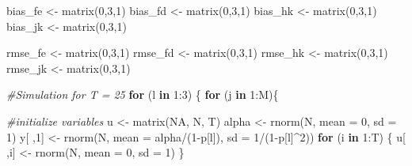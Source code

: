 \documentclass[
]{article}
\newenvironment{Shaded}{\begin{snugshade}}{\end{snugshade}}
\newcommand{\AttributeTok}[1]{\textcolor[rgb]{0.77,0.63,0.00}{#1}}
\newcommand{\CommentTok}[1]{\textcolor[rgb]{0.56,0.35,0.01}{\textit{#1}}}
\newcommand{\ConstantTok}[1]{\textcolor[rgb]{0.00,0.00,0.00}{#1}}
\newcommand{\ControlFlowTok}[1]{\textcolor[rgb]{0.13,0.29,0.53}{\textbf{#1}}}
\newcommand{\DecValTok}[1]{\textcolor[rgb]{0.00,0.00,0.81}{#1}}
\newcommand{\FunctionTok}[1]{\textcolor[rgb]{0.00,0.00,0.00}{#1}}
\newcommand{\NormalTok}[1]{#1}
\newcommand{\OtherTok}[1]{\textcolor[rgb]{0.56,0.35,0.01}{#1}}
\newcommand{\SpecialCharTok}[1]{\textcolor[rgb]{0.00,0.00,0.00}{#1}}
\begin{document}
\begin{Shaded}
\begin{Highlighting}[]
\NormalTok{bias\_fe }\OtherTok{\textless{}{-}} \FunctionTok{matrix}\NormalTok{(}\DecValTok{0}\NormalTok{,}\DecValTok{3}\NormalTok{,}\DecValTok{1}\NormalTok{)}
\NormalTok{bias\_fd }\OtherTok{\textless{}{-}} \FunctionTok{matrix}\NormalTok{(}\DecValTok{0}\NormalTok{,}\DecValTok{3}\NormalTok{,}\DecValTok{1}\NormalTok{)}
\NormalTok{bias\_hk }\OtherTok{\textless{}{-}} \FunctionTok{matrix}\NormalTok{(}\DecValTok{0}\NormalTok{,}\DecValTok{3}\NormalTok{,}\DecValTok{1}\NormalTok{)}
\NormalTok{bias\_jk }\OtherTok{\textless{}{-}} \FunctionTok{matrix}\NormalTok{(}\DecValTok{0}\NormalTok{,}\DecValTok{3}\NormalTok{,}\DecValTok{1}\NormalTok{)}

\NormalTok{rmse\_fe }\OtherTok{\textless{}{-}} \FunctionTok{matrix}\NormalTok{(}\DecValTok{0}\NormalTok{,}\DecValTok{3}\NormalTok{,}\DecValTok{1}\NormalTok{)}
\NormalTok{rmse\_fd }\OtherTok{\textless{}{-}} \FunctionTok{matrix}\NormalTok{(}\DecValTok{0}\NormalTok{,}\DecValTok{3}\NormalTok{,}\DecValTok{1}\NormalTok{)}
\NormalTok{rmse\_hk }\OtherTok{\textless{}{-}} \FunctionTok{matrix}\NormalTok{(}\DecValTok{0}\NormalTok{,}\DecValTok{3}\NormalTok{,}\DecValTok{1}\NormalTok{)}
\NormalTok{rmse\_jk }\OtherTok{\textless{}{-}} \FunctionTok{matrix}\NormalTok{(}\DecValTok{0}\NormalTok{,}\DecValTok{3}\NormalTok{,}\DecValTok{1}\NormalTok{)}

\CommentTok{\#Simulation for T = 25}
\ControlFlowTok{for}\NormalTok{ (l }\ControlFlowTok{in} \DecValTok{1}\SpecialCharTok{:}\DecValTok{3}\NormalTok{) \{}
  \ControlFlowTok{for}\NormalTok{ (j }\ControlFlowTok{in} \DecValTok{1}\SpecialCharTok{:}\NormalTok{M)\{}
    
    \CommentTok{\#initialize variables}
\NormalTok{    u }\OtherTok{\textless{}{-}} \FunctionTok{matrix}\NormalTok{(}\ConstantTok{NA}\NormalTok{, N, T)}
\NormalTok{    alpha }\OtherTok{\textless{}{-}} \FunctionTok{rnorm}\NormalTok{(N, }\AttributeTok{mean =} \DecValTok{0}\NormalTok{, }\AttributeTok{sd =} \DecValTok{1}\NormalTok{)}
\NormalTok{    y[ ,}\DecValTok{1}\NormalTok{] }\OtherTok{\textless{}{-}} \FunctionTok{rnorm}\NormalTok{(N, }\AttributeTok{mean =}\NormalTok{ alpha}\SpecialCharTok{/}\NormalTok{(}\DecValTok{1}\SpecialCharTok{{-}}\NormalTok{p[l]), }\AttributeTok{sd =} \DecValTok{1}\SpecialCharTok{/}\NormalTok{(}\DecValTok{1}\SpecialCharTok{{-}}\NormalTok{p[l]}\SpecialCharTok{\^{}}\DecValTok{2}\NormalTok{))}
    \ControlFlowTok{for}\NormalTok{ (i }\ControlFlowTok{in} \DecValTok{1}\SpecialCharTok{:}\NormalTok{T) \{}
\NormalTok{      u[ ,i] }\OtherTok{\textless{}{-}} \FunctionTok{rnorm}\NormalTok{(N, }\AttributeTok{mean =} \DecValTok{0}\NormalTok{, }\AttributeTok{sd =} \DecValTok{1}\NormalTok{)}
\NormalTok{    \}}
    

\end{Highlighting}
\end{Shaded}
\end{document}
